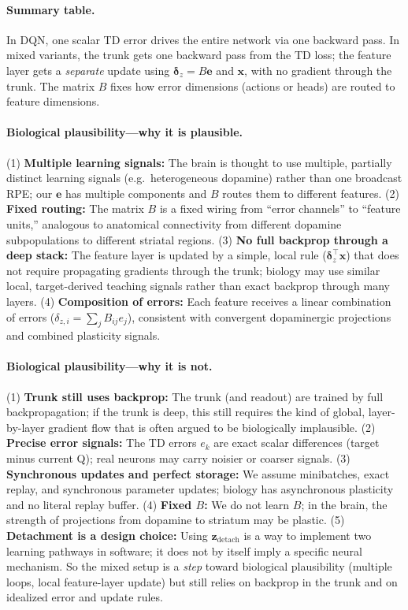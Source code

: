 \documentclass[11pt]{article}
\begin{document}
\paragraph{Summary table.} In DQN, one scalar TD error drives the entire network via one backward pass. In mixed variants, the trunk gets one backward pass from the TD loss; the feature layer gets a \emph{separate} update using $\boldsymbol{\delta}_z = B\mathbf{e}$ and $\mathbf{x}$, with no gradient through the trunk. The matrix $B$ fixes how error dimensions (actions or heads) are routed to feature dimensions.

\paragraph{Biological plausibility---why it is plausible.} (1) \textbf{Multiple learning signals:} The brain is thought to use multiple, partially distinct learning signals (e.g.\ heterogeneous dopamine) rather than one broadcast RPE; our $\mathbf{e}$ has multiple components and $B$ routes them to different features. (2) \textbf{Fixed routing:} The matrix $B$ is a fixed wiring from ``error channels'' to ``feature units,'' analogous to anatomical connectivity from different dopamine subpopulations to different striatal regions. (3) \textbf{No full backprop through a deep stack:} The feature layer is updated by a simple, local rule ($\boldsymbol{\delta}_z^{\top} \mathbf{x}$) that does not require propagating gradients through the trunk; biology may use similar local, target-derived teaching signals rather than exact backprop through many layers. (4) \textbf{Composition of errors:} Each feature receives a linear combination of errors ($\delta_{z,i} = \sum_j B_{ij} e_j$), consistent with convergent dopaminergic projections and combined plasticity signals.

\paragraph{Biological plausibility---why it is not.} (1) \textbf{Trunk still uses backprop:} The trunk (and readout) are trained by full backpropagation; if the trunk is deep, this still requires the kind of global, layer-by-layer gradient flow that is often argued to be biologically implausible. (2) \textbf{Precise error signals:} The TD errors $e_k$ are exact scalar differences (target minus current Q); real neurons may carry noisier or coarser signals. (3) \textbf{Synchronous updates and perfect storage:} We assume minibatches, exact replay, and synchronous parameter updates; biology has asynchronous plasticity and no literal replay buffer. (4) \textbf{Fixed $B$:} We do not learn $B$; in the brain, the strength of projections from dopamine to striatum may be plastic. (5) \textbf{Detachment is a design choice:} Using $\mathbf{z}_{\mathrm{detach}}$ is a way to implement two learning pathways in software; it does not by itself imply a specific neural mechanism. So the mixed setup is a \emph{step} toward biological plausibility (multiple loops, local feature-layer update) but still relies on backprop in the trunk and on idealized error and update rules.
\end{document}
